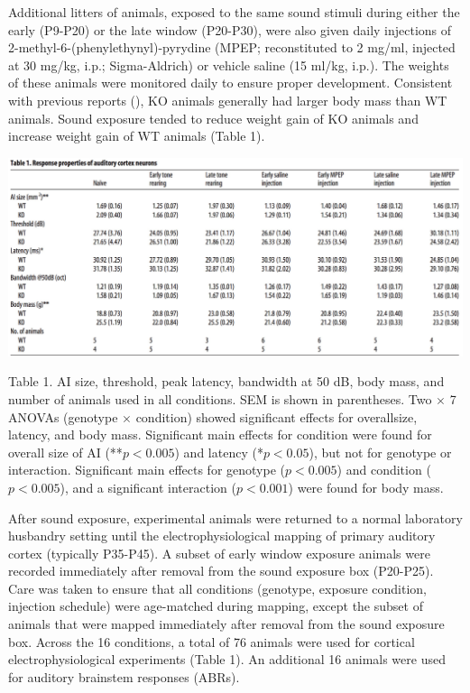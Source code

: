 Additional litters of animals, exposed to the same sound stimuli during either the early (P9-P20) or the late window (P20-P30), were also given daily injections of 2-methyl-6-(phenylethynyl)-pyrydine (MPEP; reconstituted to 2 mg/ml, injected at 30 mg/kg, i.p.; Sigma-Aldrich) or vehicle saline (15 ml/kg, i.p.). The weights of these animals were monitored daily to ensure proper development. Consistent with previous reports (\cite{Moy2009}), KO animals generally had larger body mass than WT animals. Sound exposure tended to reduce weight gain of KO animals and increase weight gain of WT animals (Table 1).

\centerline{\includegraphics[width=6in]{images/C2T1}}

\begin{changemargin}{1in}{1in}
\footnotesize{Table 1. AI size, threshold, peak latency, bandwidth at 50 dB, body mass, and number of animals used in all conditions. SEM is shown in parentheses. Two $\times$ 7 ANOVAs (genotype $\times$ condition) showed significant effects for overallsize, latency, and body mass. Significant main effects for condition were found for overall size of AI (**$p<0.005$) and latency (*$p<0.05$), but not for genotype or interaction. Significant main effects for genotype ($p<0.005$) and condition ($p<0.005$), and a significant interaction ($p<0.001$) were found for body mass.}
\end{changemargin}

After sound exposure, experimental animals were returned to a normal laboratory husbandry setting until the electrophysiological mapping of primary auditory cortex (typically P35-P45). A subset of early window exposure animals were recorded immediately after removal from the sound exposure box (P20-P25). Care was taken to ensure that all conditions (genotype, exposure condition, injection schedule) were age-matched during mapping, except the subset of animals that were mapped immediately after removal from the sound exposure box. Across the 16 conditions, a total of 76 animals were used for cortical electrophysiological experiments (Table 1). An additional 16 animals were used for auditory brainstem responses (ABRs).

